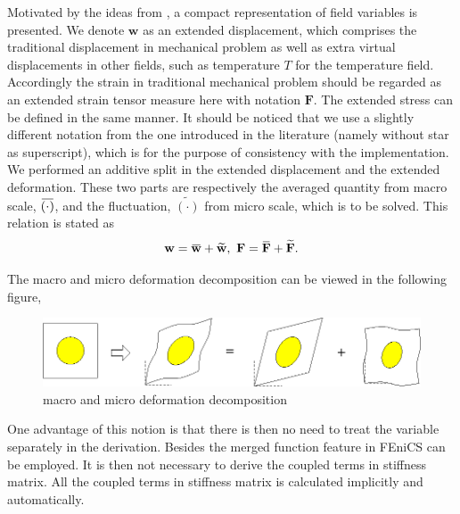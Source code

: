 \documentclass[10pt,a4paper]{scrreprt}
\newcommand{\overbar}[1]{\mkern 1.5mu\overline{\mkern-1.5mu#1\mkern-1.5mu}\mkern 1.5mu}
\begin{document}
Motivated by the ideas from \citep{miehe_homogenization_2016}, a compact representation of field variables is presented. We denote $\mathbf{w}$ as an extended displacement, which comprises the traditional displacement in mechanical problem as well as extra virtual displacements in other fields, such as temperature $T$ for the temperature field. Accordingly the strain in traditional mechanical problem should be regarded as an extended strain tensor measure here with notation $\mathbf{F}$. The extended stress can be defined in the same manner. It should be noticed that we use a slightly different notation from the one introduced in the literature \citep{miehe_homogenization_2016} (namely without star as superscript), which is for the purpose of consistency with the implementation. We performed an additive split in the extended displacement and the extended deformation. These two parts are respectively the averaged quantity from macro scale, $\overbar{(\cdot)}$, and the fluctuation, $\widetilde{(\cdot)}$ from micro scale, which is to be solved. This relation is stated as
\begin{equation}
\label{eq: decomp}
\mathbf{w} = \overbar{\mathbf{w}} + \widetilde{\mathbf{w}}, \ \mathbf{F} = \overbar{\mathbf{F}} + \widetilde{\mathbf{F}}.
\end{equation}

The macro and micro deformation decomposition can be viewed in the following figure,
\begin{figure}[h]
  \centering
    \label{fig: mima}
    \includegraphics[width=0.8\linewidth]{../pics/mima.png}
  \caption{macro and micro deformation decomposition}
\end{figure}

One advantage of this notion is that there is then no need to treat the variable separately in the derivation. Besides the merged function feature in FEniCS can be employed. It is then not necessary to derive the coupled terms in stiffness matrix. All the coupled terms in stiffness matrix is calculated implicitly and automatically.
\end{document}
